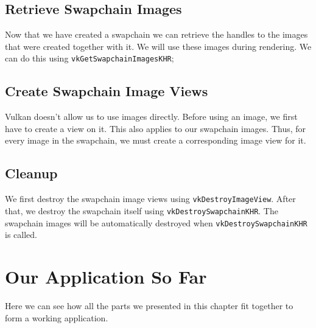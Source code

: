 \begin{minipage}{\linewidth}{\noindent}
    
\end{minipage}

\subsection{Retrieve Swapchain Images}

Now that we have created a swapchain we can retrieve the handles to the images
that were created together with it.
We will use these images during rendering.
We can do this using \texttt{vkGetSwapchainImagesKHR};

\subsection{Create Swapchain Image Views}

Vulkan doesn't allow us to use images directly.
Before using an image, we first have to create a view on it.
This also applies to our swapchain images.
Thus, for every image in the swapchain, we must create a corresponding
image view for it.

\begin{minipage}{\linewidth}{\noindent}
    
\end{minipage}

\subsection{Cleanup}

We first destroy the swapchain image views using \texttt{vkDestroyImageView}.
After that, we destroy the swapchain itself using \texttt{vkDestroySwapchainKHR}.
The swapchain images will be automatically destroyed when
\texttt{vkDestroySwapchainKHR} is called.

\section{Our Application So Far}

Here we can see how all the parts we presented in this chapter fit together
to form a working application.

\begin{minipage}{\linewidth}{\noindent}
    
\end{minipage}
